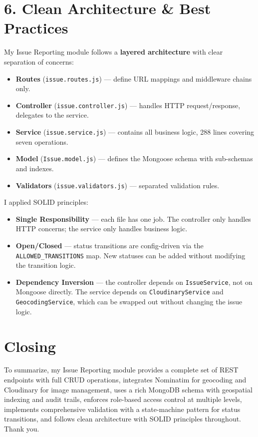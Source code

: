 \documentclass[12pt,a4paper]{article}
\begin{document}
\section{6. Clean Architecture \& Best Practices}

My Issue Reporting module follows a \textbf{layered architecture} with clear separation of concerns:

\begin{itemize}[nosep]
    \item \textbf{Routes} (\texttt{issue.routes.js}) --- define URL mappings and middleware chains only.
    \item \textbf{Controller} (\texttt{issue.controller.js}) --- handles HTTP request/response, delegates to the service.
    \item \textbf{Service} (\texttt{issue.service.js}) --- contains all business logic, 288 lines covering seven operations.
    \item \textbf{Model} (\texttt{Issue.model.js}) --- defines the Mongoose schema with sub-schemas and indexes.
    \item \textbf{Validators} (\texttt{issue.validators.js}) --- separated validation rules.
\end{itemize}

I applied SOLID principles:
\begin{itemize}[nosep]
    \item \textbf{Single Responsibility} --- each file has one job. The controller only handles HTTP concerns; the service only handles business logic.
    \item \textbf{Open/Closed} --- status transitions are config-driven via the \texttt{ALLOWED\_TRANSITIONS} map. New statuses can be added without modifying the transition logic.
    \item \textbf{Dependency Inversion} --- the controller depends on \texttt{IssueService}, not on Mongoose directly. The service depends on \texttt{CloudinaryService} and \texttt{GeocodingService}, which can be swapped out without changing the issue logic.
\end{itemize}

\section*{Closing}

To summarize, my Issue Reporting module provides a complete set of REST endpoints with full CRUD operations, integrates Nominatim for geocoding and Cloudinary for image management, uses a rich MongoDB schema with geospatial indexing and audit trails, enforces role-based access control at multiple levels, implements comprehensive validation with a state-machine pattern for status transitions, and follows clean architecture with SOLID principles throughout. Thank you.
\end{document}
